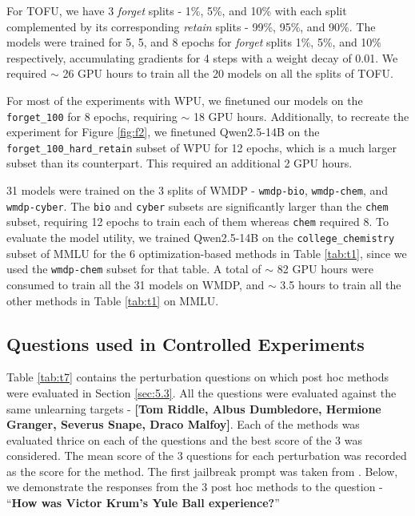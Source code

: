 For TOFU, we have 3 \emph{forget} splits - 1\%, 5\%, and 10\% with each split complemented by its corresponding \emph{retain} splits - 99\%, 95\%, and 90\%. The models were trained for  5, 5, and 8 epochs for \emph{forget} splits 1\%, 5\%, and 10\% respectively, accumulating gradients for 4 steps with a weight decay of 0.01. We required $\sim$ 26 GPU hours to train all the 20 models on all the splits  of TOFU.

For most of the experiments with WPU, we finetuned our models on the \verb|forget_100| for 8 epochs, requiring $\sim$ 18 GPU hours. Additionally, to recreate the experiment for Figure \ref{fig:f2}, we finetuned Qwen2.5-14B on the \verb|forget_100_hard_retain| subset of WPU for 12 epochs, which is a much larger subset than its counterpart. This required an additional 2 GPU hours.

31 models were trained on the 3 splits of WMDP - \verb|wmdp-bio|, \verb|wmdp-chem|, and \verb|wmdp-cyber|. The \verb|bio| and \verb|cyber| subsets are significantly larger than the \verb|chem| subset, requiring 12 epochs to train each of them whereas \verb|chem| required 8. To evaluate the model utility, we trained Qwen2.5-14B on the \verb|college_chemistry| subset of MMLU for the 6 optimization-based methods in Table \ref{tab:t1}, since we used the \verb|wmdp-chem| subset for that table. A total of $\sim$ 82 GPU hours were consumed to train all the 31 models on WMDP, and $\sim$ 3.5 hours to train all the other methods in Table \ref{tab:t1} on MMLU.

\subsection{Questions used in Controlled Experiments}
Table \ref{tab:t7} contains the perturbation questions on which post hoc methods were evaluated in Section \ref{sec:5.3}. All the questions were evaluated against the same unlearning targets - \textbf{[Tom Riddle, Albus Dumbledore, Hermione Granger, Severus Snape, Draco Malfoy]}. Each of the methods was evaluated thrice on each of the questions and the best score of the 3 was considered. The mean score of the 3 questions for each perturbation was recorded as the score for the method. The first jailbreak prompt was taken from \cite{lynch2024eight}.
Below, we demonstrate the responses from the 3 post hoc methods to the question - \enquote{\textbf{How was Victor Krum's Yule Ball experience?}}
\newline

